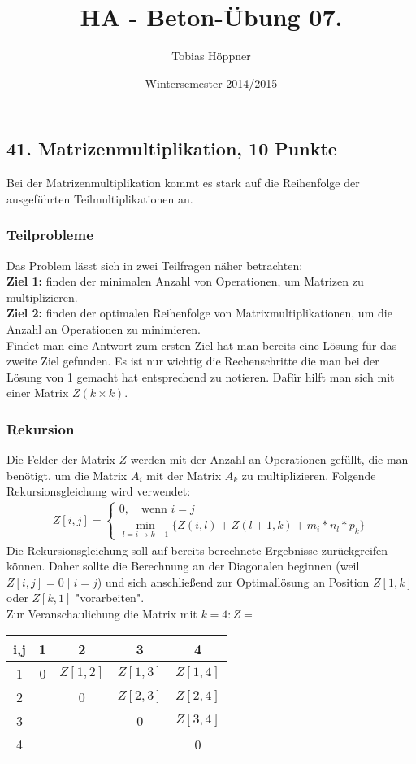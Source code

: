 \documentclass[ngerman,a4paper]{report}
\author{Tobias Höppner}
\title{HA - Beton-Übung 07.}
\date{Wintersemester 2014/2015}
\renewcommand{\maketitle}{}
\begin{document}
 
\maketitle 

\subsection*{41. Matrizenmultiplikation, 10 Punkte}
Bei der Matrizenmultiplikation kommt es stark auf die Reihenfolge der ausgeführten Teilmultiplikationen an.
\subsubsection*{Teilprobleme}
Das Problem lässt sich in zwei Teilfragen näher betrachten:\\
\textbf{Ziel 1:} finden der minimalen Anzahl von Operationen, um Matrizen zu multiplizieren.\\
\textbf{Ziel 2:} finden der optimalen Reihenfolge von Matrixmultiplikationen, um die Anzahl an Operationen zu minimieren.\\
Findet man eine Antwort zum ersten Ziel hat man bereits eine Lösung für das zweite Ziel gefunden. Es ist nur wichtig die Rechenschritte die man bei der Lösung von 1 gemacht hat entsprechend zu notieren. Dafür hilft man sich mit einer Matrix $Z (k \times k)$.
\subsubsection*{Rekursion}
Die Felder der Matrix $Z$ werden mit der Anzahl an Operationen gefüllt, die man benötigt, um die Matrix $A_i$ mit der Matrix $A_k$ zu multiplizieren. Folgende Rekursionsgleichung wird verwendet:\\
\begin{align*}
Z[i,j] = \begin{cases} 0, \quad\text{wenn } i = j \\ \min_{l = i \rightarrow k-1}\{Z(i,l) + Z(l+1,k) + m_i * n_l * p_k \}\end{cases}
\end{align*}
Die Rekursionsgleichung soll auf bereits berechnete Ergebnisse zurückgreifen können. Daher sollte die Berechnung an der Diagonalen beginnen (weil $Z[i,j] = 0\;|\;i = j$) und sich anschließend zur Optimallösung an Position $Z[1,k]$ oder $Z[k,1]$ "vorarbeiten".\\
Zur Veranschaulichung die Matrix mit $k = 4: Z=$
\begin{tabular}{|c||c|c|c|c|}
\hline
i,j &1 & 2 & 3 & 4  \\
\hline
\hline
1&  0& $Z[1,2]$ & $Z[1,3]$ & $Z[1,4]$ \\
\hline
2&  & 0 & $Z[2,3]$ & $Z[2,4]$  \\
\hline
3&  &  & 0 &$Z[3,4]$\\
\hline
4&  &  &  & 0  \\
\hline
\end{tabular}
\end{document}
